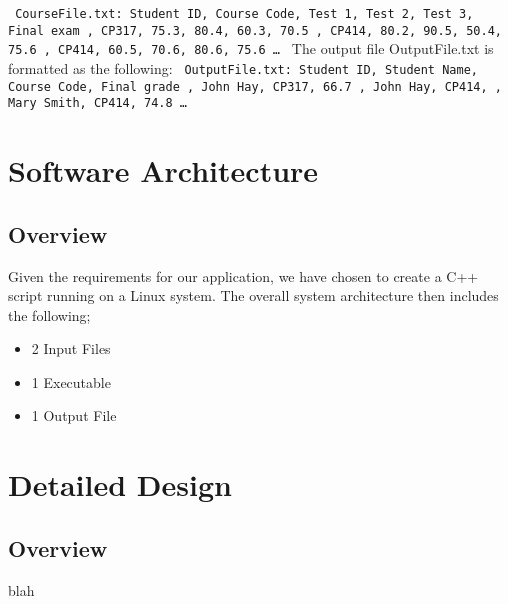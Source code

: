 \documentclass{article}
\begin{document}
\texttt{ \newline
  CourseFile.txt: \newline
  Student ID, Course Code, Test 1, Test 2, Test 3, Final exam , CP317, 75.3, 80.4, 60.3, 70.5 , CP414, 80.2, 90.5, 50.4, 75.6 , CP414, 60.5, 70.6, 80.6, 75.6 \newline
  \ldots
}
\newline \newline
The output file OutputFile.txt is formatted as the following:
\texttt{ \newline
  OutputFile.txt: \newline
  Student ID, Student Name, Course Code, Final grade , John Hay, CP317, 66.7 , John Hay, CP414, , Mary Smith, CP414, 74.8 \newline
  \ldots
}

\section{Software Architecture}
\subsection{Overview}
Given the requirements for our application, we have chosen to create a C++ script running on a Linux system.
The overall system architecture then includes the following; 
\begin{itemize}
\item 2 Input Files
\item 1 Executable
\item 1 Output File
\end{itemize}

\section{Detailed Design}
\subsection{Overview}
blah
\end{document}
